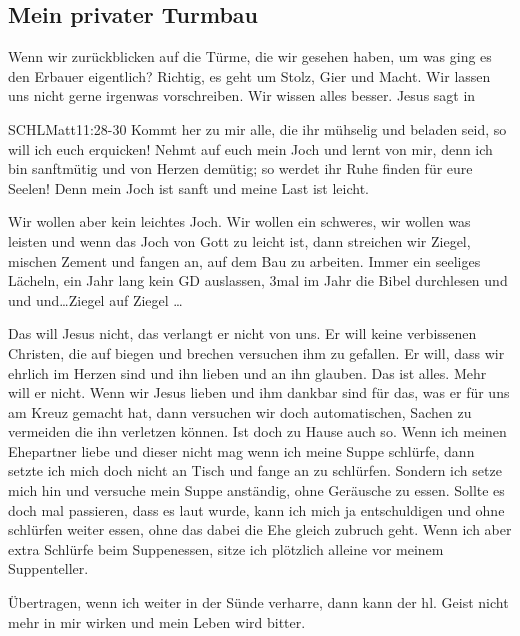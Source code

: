 \documentclass[14pt]{../../inc/mybib}
\newenvironment{block}[1][]{%
  \vspace{1.5em}%
  \noindent\textbf{#1}\par%
  \vspace{0.0em}%
}{%
  \vspace{1em}%
}
\begin{document}
    \subsection{Mein privater Turmbau}
\begin{block}
    Wenn wir zurückblicken auf die Türme, die wir gesehen haben, um was ging es den Erbauer eigentlich? Richtig, es geht um Stolz, Gier und Macht. Wir lassen uns nicht gerne irgenwas vorschreiben. Wir wissen alles besser. Jesus sagt in  
    \begin{bibelbox}{SCHL}{Matt}{11:28-30}
        Kommt her zu mir alle, die ihr mühselig und beladen seid, so will ich euch erquicken!
        Nehmt auf euch mein Joch und lernt von mir, denn ich bin sanftmütig und von Herzen demütig; so werdet ihr Ruhe finden für eure Seelen!
        Denn mein Joch ist sanft und meine Last ist leicht.
    \end{bibelbox}  
    Wir wollen aber kein leichtes Joch. Wir wollen ein schweres, wir wollen was leisten und wenn das Joch von Gott zu leicht ist, dann streichen wir Ziegel, mischen Zement und fangen an, auf dem Bau zu arbeiten. Immer ein seeliges Lächeln, ein Jahr lang kein GD auslassen, 3mal im Jahr die Bibel durchlesen und und und\dots Ziegel auf Ziegel \dots
\end{block}
\begin{block}
    Das will Jesus nicht, das verlangt er nicht von uns. Er will keine verbissenen Christen, die auf biegen und brechen versuchen ihm zu gefallen. Er will, dass wir ehrlich im Herzen sind und ihn lieben und an ihn glauben. Das ist alles. Mehr will er nicht. Wenn wir Jesus lieben und ihm dankbar sind für das, was er für uns am Kreuz gemacht hat, dann versuchen wir doch automatischen, Sachen zu vermeiden die ihn verletzen können. Ist doch zu Hause auch so. Wenn ich meinen Ehepartner liebe und dieser nicht mag wenn ich meine Suppe schlürfe, dann setzte ich mich doch nicht an Tisch und fange an zu schlürfen. Sondern ich setze mich hin und versuche mein Suppe anständig, ohne Geräusche zu essen. Sollte es doch mal passieren, dass es laut wurde, kann ich mich ja entschuldigen und ohne schlürfen weiter essen, ohne das dabei die Ehe gleich zubruch geht. Wenn ich aber extra Schlürfe beim Suppenessen, sitze ich plötzlich alleine vor meinem Suppenteller.

    Übertragen, wenn ich weiter in der Sünde verharre, dann kann der hl. Geist nicht mehr in mir wirken und mein Leben wird bitter.
\end{block}
\end{document}
